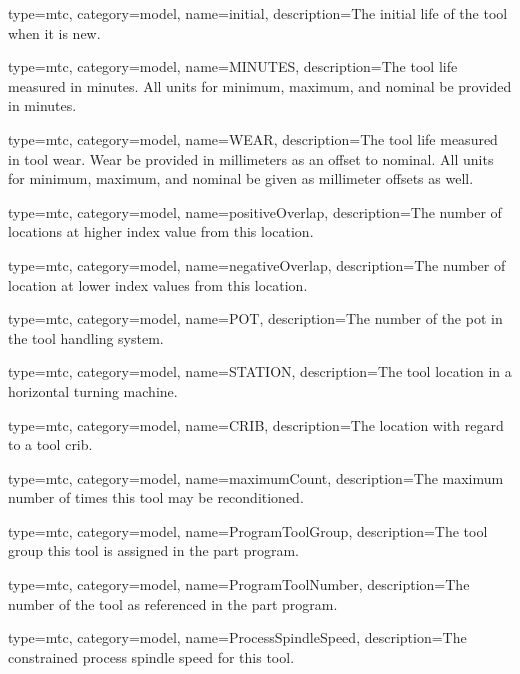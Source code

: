 {
  type=mtc,
  category=model,
  name={initial},
  description={The initial life of the tool when it is new.}
}


{
  type=mtc,
  category=model,
  name={MINUTES},
  description={The tool life measured in minutes. All units for minimum, maximum, and nominal \MUST be provided in minutes.}
}


{
  type=mtc,
  category=model,
  name={WEAR},
  description={The tool life measured in tool wear. Wear \MUST be provided in millimeters as an offset to nominal. All units for minimum, maximum, and nominal \MUST be given as millimeter offsets as well. }
}



{
  type=mtc,
  category=model,
  name={positiveOverlap},
  description={The number of locations at higher index value from this location.}
}


{
  type=mtc,
  category=model,
  name={negativeOverlap},
  description={The number of location at lower index values from this location.}
}


{
  type=mtc,
  category=model,
  name={POT},
  description={The number of the pot in the tool handling system.}
}


{
  type=mtc,
  category=model,
  name={STATION},
  description={The tool location in a horizontal turning machine.}
}


{
  type=mtc,
  category=model,
  name={CRIB},
  description={The location with regard to a tool crib.}
}


{
  type=mtc,
  category=model,
  name={maximumCount},
  description={The maximum number of times this tool may be reconditioned.}
}



{
  type=mtc,
  category=model,
  name={ProgramToolGroup},
  description={The tool group this tool is assigned in the part program.}
}


{
  type=mtc,
  category=model,
  name={ProgramToolNumber},
  description={The number of the tool as referenced in the part program.}
}


{
  type=mtc,
  category=model,
  name={ProcessSpindleSpeed},
  description={The constrained process spindle speed for this tool.}
}


